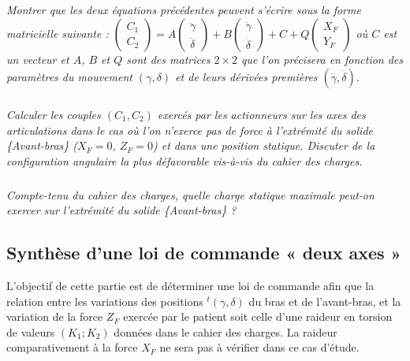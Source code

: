\begin{multicols}{2}
\subparagraph{}\textit{Montrer que les deux équations précédentes peuvent s'écrire sous la forme matricielle suivante : 
$\begin{pmatrix}
C_1 \\ C_2
\end{pmatrix}
=
A
\begin{pmatrix}
\ddot{\gamma} \\ \ddot{\delta}
\end{pmatrix}
+
B
\begin{pmatrix}
\dot{\gamma} \\ \dot{\delta}
\end{pmatrix}
+
C
+
Q
\begin{pmatrix}
X_F \\ Y_F
\end{pmatrix}$ où $C$ est un vecteur et $A$, $B$ et $Q$ sont des matrices $2\times 2$ que l'on précisera en fonction des paramètres du mouvement $\left(\gamma,\delta\right)$ et de leurs dérivées premières $\left(\dot{\gamma},\dot{\delta}\right)$.
}

\ifprof
\begin{corrige}
\end{corrige}
\else
\fi


\subparagraph{}
\textit{Calculer les couples $(C_1,C_2)$ exercés par les actionneurs sur les axes des articulations dans le cas où
l’on n’exerce pas de force à l’extrémité du solide \{Avant-bras\} ($X_F = 0$, $Z_F = 0$) et dans une position statique. Discuter de la configuration angulaire la plus défavorable vis-à-vis du cahier des charges.}
\ifprof
\begin{corrige}
\end{corrige}
\else
\fi


\subparagraph{}
\textit{Compte-tenu du cahier des charges, quelle charge statique maximale peut-on exercer sur l’extrémité du solide \{Avant-bras\} ?}
\ifprof
\begin{corrige}
\end{corrige}
\else
\fi



\subsection*{Synthèse d’une loi de commande « deux axes »}

\begin{obj}
L’objectif de cette partie est de déterminer une loi de commande afin que la relation entre les variations
des positions $ ^t\left(\gamma,\delta\right)$ du bras et de l’avant-bras, et la variation de la force $Z_F$ exercée par le patient soit celle d’une raideur en torsion de valeurs $(K_1;K_2)$ données dans le cahier des charges. La raideur comparativement à la force $X_F$ ne sera pas à vérifier dans ce cas d’étude.
\end{obj}



\end{multicols}
